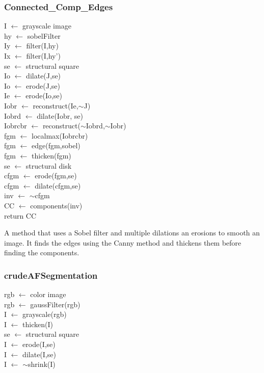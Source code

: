 \documentclass[12pt]{article}
\begin{document}
\subsubsection*{Connected\_Comp\_Edges}
\begin{addmargin}[12em]{1em}
	I $\leftarrow$ grayscale image \\
	hy $\leftarrow$ sobelFilter \\
	Iy $\leftarrow$ filter(I,hy) \\
	Ix $\leftarrow$ filter(I,hy') \\
	se $\leftarrow$ structural square \\
	Io $\leftarrow$ dilate(J,se) \\
	Io $\leftarrow$ erode(J,se) \\
	Ie $\leftarrow$ erode(Io,se) \\
	Iobr $\leftarrow$ reconstruct(Ie,$\sim$J) \\
	Iobrd $\leftarrow$ dilate(Iobr, se) \\
	Iobrcbr $\leftarrow$ reconstruct($\sim$Iobrd,$\sim$Iobr) \\
	fgm $\leftarrow$ localmax(Iobrcbr) \\
	fgm $\leftarrow$ edge(fgm,sobel) \\
	fgm $\leftarrow$ thicken(fgm) \\
	se $\leftarrow$ structural disk \\
	cfgm $\leftarrow$ erode(fgm,se) \\
	cfgm $\leftarrow$ dilate(cfgm,se) \\
	inv $\leftarrow$ $\sim$cfgm \\
	CC $\leftarrow$ components(inv) \\
	return CC \\		
\end{addmargin}
A method that uses a Sobel filter and multiple dilations an erosions to smooth an image. It finds the edges using the Canny method and thickens them before finding the components.

\subsubsection*{crudeAFSegmentation}
\begin{addmargin}[12em]{1em}
	rgb $\leftarrow$ color image \\
	rgb $\leftarrow$ gaussFilter(rgb) \\
	I $\leftarrow$ grayscale(rgb) \\
	I $\leftarrow$ thicken(I) \\ 
	se $\leftarrow$ structural square \\
	I $\leftarrow$ erode(I,se) \\
	I $\leftarrow$ dilate(I,se) \\
	I $\leftarrow$ $\sim$shrink(I) \\ 
\end{addmargin}
\end{document}
